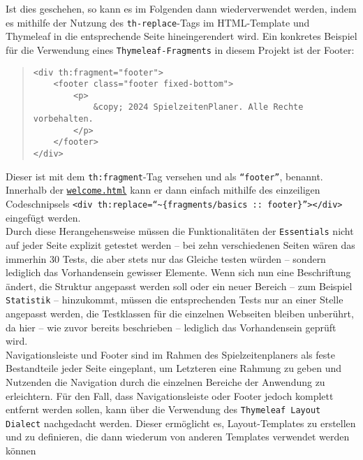 \pagebreak

Ist dies geschehen, so kann es im Folgenden dann wiederverwendet werden, indem es 
mithilfe der Nutzung des \texttt{th-replace}-Tags im HTML-Template und Thymeleaf in 
die entsprechende Seite hineingerendert wird. Ein konkretes Beispiel für die 
Verwendung eines \texttt{Thymeleaf-Fragments} in diesem Projekt ist der Footer: 

\begin{quote}
\begin{verbatim}
<div th:fragment="footer">
    <footer class="footer fixed-bottom">
        <p>
            &copy; 2024 SpielzeitenPlaner. Alle Rechte vorbehalten. 
        </p>
    </footer>
</div>
\end{verbatim}
\end{quote}

Dieser ist mit dem \texttt{th:fragment}-Tag versehen und als \texttt{``footer''}, 
benannt. Innerhalb der \href{https://github.com/FlorianOhmes/bat_spielzeitenplaner/blob/main/spielzeitenplaner/src/main/resources/templates/welcome.html}{\texttt{welcome.html}}
kann er dann einfach mithilfe des einzeiligen Codeschnipsels
\texttt{<div \linebreak th:replace=``\textasciitilde\{fragments/basics :: footer\}''></div>}
eingefügt werden. \\ 
Durch diese Herangehensweise müssen die Funktionalitäten der \texttt{Essentials} 
nicht auf jeder Seite explizit getestet werden -- bei zehn verschiedenen Seiten 
wären das immerhin 30 Tests, die aber stets nur das Gleiche testen würden -- 
sondern lediglich das Vorhandensein gewisser Elemente. Wenn sich nun eine 
Beschriftung ändert, die Struktur angepasst werden soll oder ein neuer Bereich -- 
zum Beispiel \texttt{Statistik} -- hinzukommt, müssen die entsprechenden Tests nur 
an einer Stelle angepasst werden, die Testklassen für die einzelnen Webseiten 
bleiben unberührt, da hier -- wie zuvor bereits beschrieben -- lediglich das 
Vorhandensein geprüft wird. \\ 
Navigationsleiste und Footer sind im Rahmen des Spielzeitenplaners als feste 
Bestandteile jeder Seite eingeplant, um Letzteren eine Rahmung zu geben und 
Nutzenden die Navigation durch die einzelnen Bereiche der Anwendung zu erleichtern. 
Für den Fall, dass Navigationsleiste oder Footer jedoch komplett entfernt werden 
sollen, kann über die Verwendung des \texttt{Thymeleaf Layout Dialect} nachgedacht 
werden. Dieser ermöglicht es, Layout-Templates zu erstellen und zu definieren, die 
dann wiederum von anderen Templates verwendet werden können 
